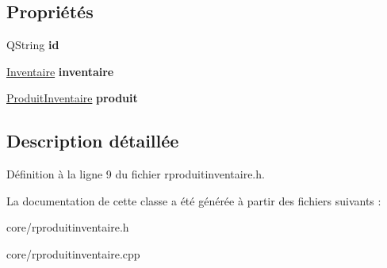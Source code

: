 \subsection*{Propriétés}
\begin{DoxyCompactItemize}
\item 
\hypertarget{class_core_1_1_r_produit_inventaire_a3876ef2353d749ee6532b071d445f90a}{
QString {\bfseries id}}
\label{d0/de7/class_core_1_1_r_produit_inventaire_a3876ef2353d749ee6532b071d445f90a}

\item 
\hypertarget{class_core_1_1_r_produit_inventaire_a3606e4f9075928c283a29c50a53c4e29}{
\hyperlink{class_core_1_1_inventaire}{Inventaire} {\bfseries inventaire}}
\label{d0/de7/class_core_1_1_r_produit_inventaire_a3606e4f9075928c283a29c50a53c4e29}

\item 
\hypertarget{class_core_1_1_r_produit_inventaire_a557a668687200199217116c38142039d}{
\hyperlink{class_core_1_1_produit_inventaire}{ProduitInventaire} {\bfseries produit}}
\label{d0/de7/class_core_1_1_r_produit_inventaire_a557a668687200199217116c38142039d}

\end{DoxyCompactItemize}


\subsection{Description détaillée}


Définition à la ligne 9 du fichier rproduitinventaire.h.



La documentation de cette classe a été générée à partir des fichiers suivants :\begin{DoxyCompactItemize}
\item 
core/rproduitinventaire.h\item 
core/rproduitinventaire.cpp\end{DoxyCompactItemize}
